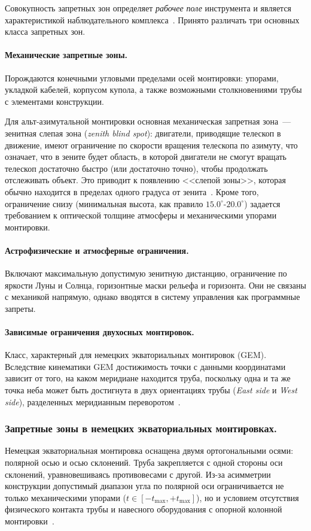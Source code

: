 Совокупность запретных зон определяет \textit{рабочее поле} инструмента и является характеристикой наблюдательного комплекса~\cite{ESO_Horizon}. Принято различать три основных класса запретных зон.

\paragraph{Механические запретные зоны.}Порождаются конечными угловыми пределами осей монтировки: упорами, укладкой кабелей, корпусом купола, а также возможными столкновениями трубы с элементами конструкции.

Для альт-азимутальной монтировки основная механическая запретная зона~--- зенитная слепая зона (\textit{zenith blind spot}): двигатели, приводящие телескоп в движение, имеют ограничение по скорости вращения телескопа по азимуту, что означает, что в зените будет область, в которой двигатели не смогут вращать телескоп достаточно быстро (или достаточно точно), чтобы продолжать отслеживать объект. Это приводит к появлению <<слепой зоны>>, которая обычно находится в пределах одного градуса от зенита~\cite{TPoint_Wallace}. Кроме того, ограничение снизу (минимальная высота, как правило $15.0^\circ$-$20.0^\circ$) задается требованием к оптической толщине атмосферы и механическими упорами монтировки. 

\paragraph{Астрофизические и атмосферные ограничения.} Включают максимальную допустимую зенитную дистанцию, ограничение по яркости Луны и Солнца, горизонтные маски рельефа и горизонта. Они не связаны с механикой напрямую, однако вводятся в систему управления как программные запреты.

\paragraph{Зависимые ограничения двухосных монтировок.} Класс, характерный для немецких экваториальных монтировок (GEM). Вследствие кинематики GEM достижимость точки с данными координатами зависит от того, на каком меридиане находится труба, поскольку одна и та же точка неба может быть достигнута в двух ориентациях трубы (\textit{East side} и \textit{West side}), разделенных меридианным переворотом~\cite{ATUS_Stuttgart}\cite{EQMOD_Limits}.

\subsubsection{Запретные зоны в немецких экваториальных монтировках.} Немецкая экваториальная монтировка оснащена двумя ортогональными осями: полярной осью и осью склонений. Труба закрепляется с одной стороны оси склонений, уравновешиваясь противовесами с другой. Из-за асимметрии конструкции допустимый диапазон угла по полярной оси ограничивается не только механическими упорами ($t \in [-t_{\max}, +t_{\max}]$), но и условием отсутствия физического контакта трубы и навесного оборудования с опорной колонной монтировки~\cite{TPoint_Wallace}.

